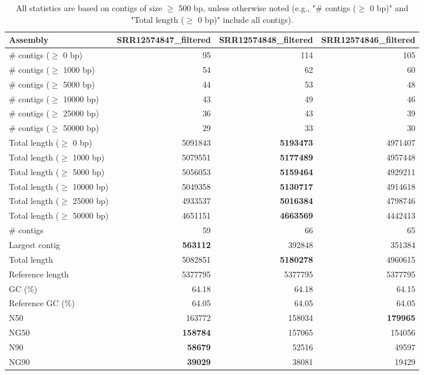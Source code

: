 \documentclass[12pt,a4paper]{article}
\begin{document}
\begin{table}[ht]
\begin{center}
\caption{All statistics are based on contigs of size $\geq$ 500 bp, unless otherwise noted (e.g., "\# contigs ($\geq$ 0 bp)" and "Total length ($\geq$ 0 bp)" include all contigs).}
\begin{tabular}{|l*{3}{|r}|}
\hline
Assembly & SRR12574847\_filtered & SRR12574848\_filtered & SRR12574846\_filtered \\ \hline
\# contigs ($\geq$ 0 bp) & 95 & 114 & 105 \\ \hline
\# contigs ($\geq$ 1000 bp) & 54 & 62 & 60 \\ \hline
\# contigs ($\geq$ 5000 bp) & 44 & 53 & 48 \\ \hline
\# contigs ($\geq$ 10000 bp) & 43 & 49 & 46 \\ \hline
\# contigs ($\geq$ 25000 bp) & 36 & 43 & 39 \\ \hline
\# contigs ($\geq$ 50000 bp) & 29 & 33 & 30 \\ \hline
Total length ($\geq$ 0 bp) & 5091843 & {\bf 5193473} & 4971407 \\ \hline
Total length ($\geq$ 1000 bp) & 5079551 & {\bf 5177489} & 4957448 \\ \hline
Total length ($\geq$ 5000 bp) & 5056053 & {\bf 5159464} & 4929211 \\ \hline
Total length ($\geq$ 10000 bp) & 5049358 & {\bf 5130717} & 4914618 \\ \hline
Total length ($\geq$ 25000 bp) & 4933537 & {\bf 5016384} & 4798746 \\ \hline
Total length ($\geq$ 50000 bp) & 4651151 & {\bf 4663569} & 4442413 \\ \hline
\# contigs & 59 & 66 & 65 \\ \hline
Largest contig & {\bf 563112} & 392848 & 351384 \\ \hline
Total length & 5082851 & {\bf 5180278} & 4960615 \\ \hline
Reference length & 5377795 & 5377795 & 5377795 \\ \hline
GC (\%) & 64.18 & 64.18 & 64.15 \\ \hline
Reference GC (\%) & 64.05 & 64.05 & 64.05 \\ \hline
N50 & 163772 & 158034 & {\bf 179965} \\ \hline
NG50 & {\bf 158784} & 157065 & 154056 \\ \hline
N90 & {\bf 58679} & 52516 & 49597 \\ \hline
NG90 & {\bf 39029} & 38081 & 19429 \\ \hline

\end{tabular}
\end{center}
\end{table}
\end{document}
